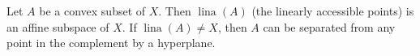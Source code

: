 Let $A$ be a convex subset of $X$. Then $\operatorname{lina}(A)$ (the linearly accessible points) is an affine subspace of $X$. If $\operatorname{lina}(A) \neq X$, then $A$ can be separated from any point in the complement by a hyperplane.
